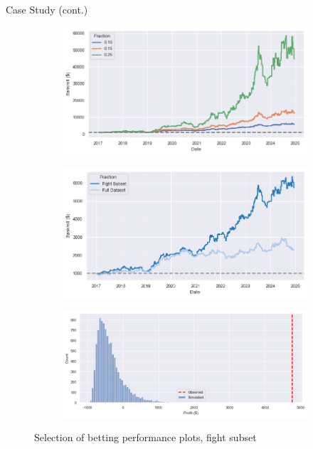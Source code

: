 \documentclass[aspectratio=169,xcolor=dvipsnames]{beamer}
\begin{document}
\begin{frame}{Case Study (cont.)}
    \begin{figure}[!htb]
    \centering
    \captionsetup{justification=centering}
    \begin{subfigure}{.4\linewidth}
      \centering
      \includegraphics[width=\linewidth]{figures/bankroll_lr_case_study_simultaneous.png}
    \end{subfigure}%
    \begin{subfigure}{.4\linewidth}
      \centering
      \includegraphics[width=\linewidth]{figures/bankroll_comparison.png}
    \end{subfigure}
    \begin{subfigure}{.5\linewidth}
      \centering
      \includegraphics[width=\linewidth]{figures/mc_results_case_study.png}
    \end{subfigure}
    \caption{Selection of betting performance plots, fight subset}
    \end{figure}
\end{frame}
\end{document}
